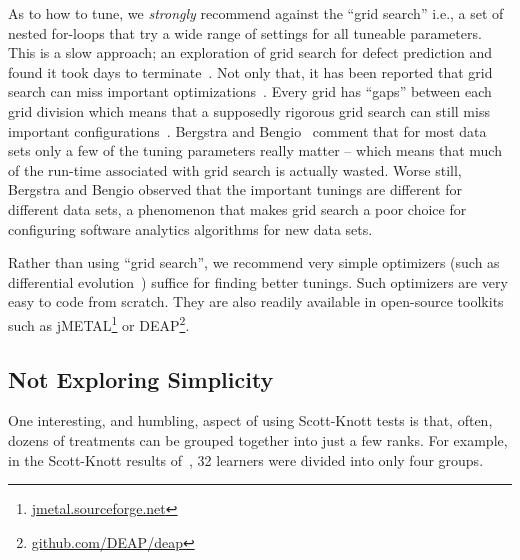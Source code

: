 \documentclass[preprint,10pt]{elsarticle}
\begin{document}
As to how to tune, we {\em strongly} recommend against the ``grid search'' i.e., a set of nested for-loops that try a wide range of settings for all tuneable parameters. This is a slow approach; an exploration of grid search for defect prediction and found it took days to terminate~\cite{fu2016}.  Not only that, it has been reported that grid search can miss important optimizations~\cite{Fu16}. Every grid has “gaps” between each grid division which means that a supposedly rigorous grid search can still miss important configurations~\cite{bergstra2012random}. Bergstra and Bengio~\cite{bergstra2012random} comment that for most data sets only a few of the tuning parameters really matter – which means that much of the run-time associated with grid search is actually wasted.  Worse still, Bergstra and Bengio observed that the important tunings are different for different data sets, a phenomenon that makes grid search a poor choice for configuring software analytics algorithms for new data sets.
 
Rather than using ``grid search'', we recommend very simple optimizers (such as differential evolution~\cite{Storn1997}) suffice for finding better tunings. Such optimizers are very easy to code from scratch. They are also readily available in open-source toolkits such as jMETAL\footnote{
\href{http://jmetal.sourceforge.net}{jmetal.sourceforge.net}} or DEAP\footnote{\href{http://github.com/DEAP/deap}{github.com/DEAP/deap}}.


 
\subsection{Not Exploring Simplicity}\label{sec:simple} 

One interesting, and humbling, aspect of using Scott-Knott tests is that, often, dozens of treatments can be grouped together into just a few ranks. For example, in the Scott-Knott results of~\cite{ghotra2015}, 32 learners were divided into only four groups. 
\end{document}
